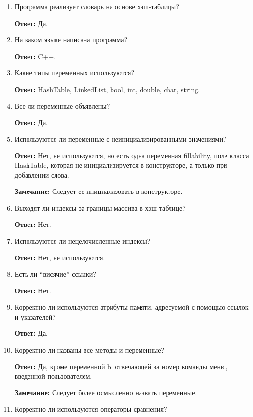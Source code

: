 \documentclass[11pt,a4paper,final]{article} %
\begin{document}
\begin{enumerate}
	\item Программа реализует словарь на основе хэш-таблицы?
	
	\textbf{Ответ:} Да.
	
	\item На каком языке написана программа?
	
	\textbf{Ответ:} C++.
	
	\item Какие типы переменных используются?
	
	\textbf{Ответ:} HashTable, LinkedList, bool, int, double, char, string.
		
	\item Все ли переменные объявлены?
	
	\textbf{Ответ:} Да.
	
	\item Используются ли переменные с неинициализированными значениями?
	
	\textbf{Ответ:} Нет, не используются, но есть одна переменная fillability, поле класса HashTable, которая не инициализируется в конструкторе, а только при добавлении слова.
	
	\textbf{Замечание:} Следует ее инициализовать в конструкторе.
	
	\item Выходят ли индексы за границы массива в хэш-таблице?
	
	\textbf{Ответ:} Нет.
	
	\item Используются ли нецелочисленные индексы?
	
	\textbf{Ответ:} Нет, не используются.
	
	\item Есть ли ``висячие'' ссылки?
	
	\textbf{Ответ:} Нет.
	
	\item Корректно ли используются атрибуты памяти, адресуемой с помощью ссылок и указателей?
	
	\textbf{Ответ:} Да.
	
	\item Корректно ли названы все методы и переменные?
	
	\textbf{Ответ:} Да, кроме переменной b, отвечающей за номер команды меню, введенной пользователем.
	
	\textbf{Замечание:} Следует более осмысленно назвать переменные.
	
	\item Корректно ли используются операторы сравнения?
	

\end{enumerate}
\end{document}
